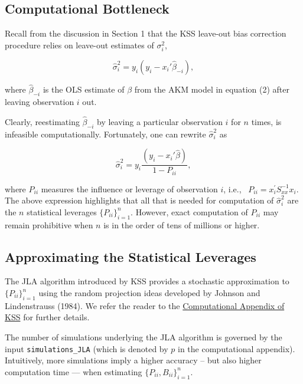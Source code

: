 \documentclass[11pt]{article}
\begin{document}
\hypertarget{computational-bottleneck}{%
\subsection{Computational Bottleneck}\label{computational-bottleneck}}

Recall from the discussion in Section 1 that the KSS leave-out bias
correction procedure relies on leave-out estimates of \(\sigma^{2}_{i}\),

\begin{equation}
\hat{\sigma}^{2}_{i}=y_{i}(y_{i}-x_{i}'\hat{\beta}_{-i}),
\end{equation}

where \(\hat{\beta}_{-i}\) is the OLS estimate of \(\beta\) from the AKM
model in equation (2) after leaving observation \(i\) out.

Clearly, reestimating \(\hat{\beta}_{-i}\) by leaving a particular
observation \(i\) for \(n\) times, is infeasible computationally.
Fortunately, one can rewrite \(\hat{\sigma}^{2}_{i}\) as

\begin{equation}
\hat{\sigma}^{2}_{i}=y_{i}\frac{(y_{i}-x_{i}'\hat{\beta})}{1-P_{ii}},
\end{equation}

where \(P_{ii}\) measures the influence or leverage of observation
\(i\), i.e., ~\(P_{ii} =x_i^{\prime } S_{xx}^{-1} x_i\). The above expression
highlights that all that is needed for computation of
\(\hat{\sigma}^{2}_{i}\) are the \(n\) statistical leverages
\(\{P_{ii}\}_{i=1}^{n}\). However, exact computation of \(P_{ii}\) may remain prohibitive when \(n\) is in the order of tens of millions or
higher.

\hypertarget{the-jla-algorithm}{%
\subsection{Approximating the Statistical Leverages}\label{the-jla-algorithm}}

The JLA algorithm introduced by KSS provides a stochastic approximation
to \(\{P_{ii}\}_{i=1}^{n}\) using the random projection ideas developed
by Johnson and Lindenstrauss (1984). We refer the reader to the
\href{https://www.dropbox.com/s/ycvls8pbtxewj06/DataComputationAppendix.pdf?dl=1}{Computational Appendix of KSS} for further details.

The number of simulations underlying the JLA algorithm is governed by
the input \texttt{simulations\_JLA} (which is denoted by \(p\) in the
computational appendix). Intuitively, more simulations imply a
higher accuracy -- but also higher computation time --- when estimating
\(\lbrace P_{ii} ,B_{ii} \rbrace_{i=1}^n\).
\end{document}
